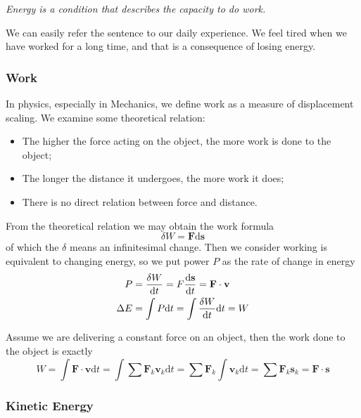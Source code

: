 \documentclass[12pt]{article}
\renewcommand{\d}[1]{\mathrm{d}{#1}}
\begin{document}
    \begin{center}
        \textit{Energy is a condition that describes the capacity to do work.}
    \end{center}

    We can easily refer the sentence to our daily experience. We feel tired when we have worked for a long time, and that is a consequence of losing energy.

    \subsubsection*{Work}

    In physics, especially in Mechanics, we define work as a measure of displacement scaling. We examine some theoretical relation:\begin{itemize}
        \item The higher the force acting on the object, the more work is done to the object;
        \item The longer the distance it undergoes, the more work it does;
        \item There is no direct relation between force and distance.
    \end{itemize}
    From the theoretical relation we may obtain the work formula \[\delta W = \mathbf{F} \d{\mathbf{s}}\] of which the $\delta$ means an infinitesimal change. Then we consider working is equivalent to changing energy, so we put power $P$ as the rate of change in energy \begin{align*}
        P&=\frac{\delta W}{\d{t}}=F\derivative{\mathbf{s}}{t}=\mathbf{F\cdot v}\\
        \Delta E&=\int P \d{t} = \int \frac{\delta W}{\d{t}} \d{t} = W
    \end{align*}

    Assume we are delivering a constant force on an object, then the work done to the object is exactly \[W=\int \mathbf{F\cdot v} \d{t} = \int \sum \mathbf{F}_k \mathbf{v}_k \d{t} = \sum \mathbf{F}_k \int \mathbf{v}_k \d{t} = \sum \mathbf{F}_k \mathbf{s}_k = \mathbf{F\cdot s}\]

    \subsubsection*{Kinetic Energy}
\end{document}
